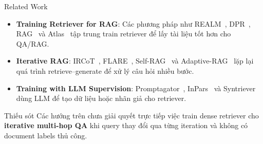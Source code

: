 \documentclass{beamer}
\begin{document}
\begin{frame}{Related Work}
\small

\begin{itemize}
    \item \textbf{Training Retriever for RAG}:
    Các phương pháp như REALM~\cite{guu2020realm}, DPR~\cite{karpukhin2020dpr},
    RAG~\cite{lewis2020rag} và Atlas~\cite{izacard2023atlas}
    tập trung train retriever để lấy tài liệu tốt hơn cho QA/RAG.

    \item \textbf{Iterative RAG}:
    IRCoT~\cite{trivedi2023ircot}, FLARE~\cite{jiang2023flare},
    Self-RAG~\cite{asai2023selfrag} và Adaptive-RAG~\cite{jeong2024adaptive}
    lặp lại quá trình retrieve--generate để xử lý câu hỏi nhiều bước.

    \item \textbf{Training with LLM Supervision}:
    Promptagator~\cite{dai2023promptagator}, InPars~\cite{bonifacio2022inpars}
    và Syntriever~\cite{kim2025syntriever}
    dùng LLM để tạo dữ liệu hoặc nhãn giả cho retriever.
\end{itemize}

\begin{block}{Thiếu sót}
Các hướng trên chưa giải quyết trực tiếp việc train dense retriever cho
\textbf{iterative multi-hop QA} khi query thay đổi qua từng iteration và không có document labels thủ công.
\end{block}

\end{frame}


    
    
    
\end{document}
